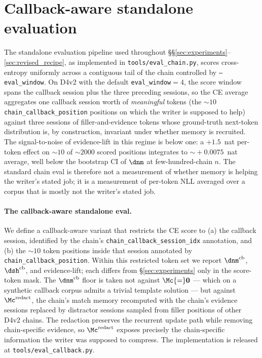 %
%

\section{Callback-aware standalone evaluation}
\label{sec:eval_cb}

The standalone evaluation pipeline used throughout
\S\S\ref{sec:experiments}--\ref{sec:revised_recipe}, as implemented
in \texttt{tools/eval\_chain.py}, scores cross-entropy uniformly
across a contiguous tail of the chain controlled by
\texttt{--eval\_window}. On D4v2 with the default
\texttt{eval\_window}${=}4$, the score window spans the callback
session plus the three preceding sessions, so the CE average
aggregates one callback session worth of \emph{meaningful} tokens
(the $\sim\!10$ \texttt{chain\_callback\_position} positions on
which the writer is supposed to help) against three sessions of
filler-and-evidence tokens whose ground-truth next-token
distribution is, by construction, invariant under whether memory
is recruited. The signal-to-noise of evidence-lift in this regime
is below one: a $+1.5$~nat per-token effect on $\sim\!10$ of
$\sim\!2000$ scored positions integrates to $\sim\!+0.0075$~nat
average, well below the bootstrap CI of $\dnm$ at few-hundred-chain
$n$. The standard chain eval is therefore not a measurement of
whether memory is helping the writer's stated job; it is a
measurement of per-token NLL averaged over a corpus that is mostly
not the writer's stated job.

\paragraph{The callback-aware standalone eval.} We define a
callback-aware variant that restricts the CE score to (a) the
callback session, identified by the chain's
\texttt{chain\_callback\_session\_idx} annotation, and (b) the
$\sim\!10$ token positions inside that session annotated by
\texttt{chain\_callback\_position}. Within this restricted token
set we report $\dnm^{\text{cb}}$, $\dsh^{\text{cb}}$, and
evidence-lift; each differs from \S\ref{sec:experiments} only in
the score-token mask. The $\dnm^{\text{cb}}$ floor is taken not
against $\Mc{=}\mathbf{0}$ --- which on a synthetic callback corpus
admits a trivial template solution --- but against
$\Mc^{\text{redact}}$, the chain's match memory recomputed with
the chain's evidence sessions replaced by distractor sessions
sampled from filler positions of other D4v2 chains. The redaction
preserves the recurrent update path while removing chain-specific
evidence, so $\Mc^{\text{redact}}$ exposes precisely the
chain-specific information the writer was supposed to compress.
The implementation is released at \texttt{tools/eval\_callback.py}.

